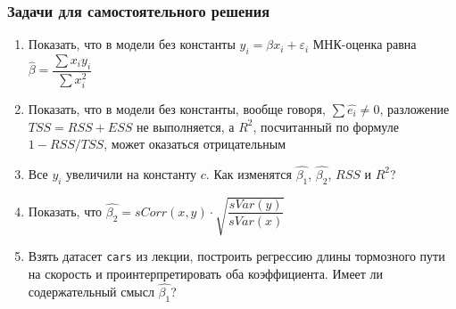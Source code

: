 \documentclass[12pt,a4paper]{article}
\numberwithin{equation}{section}
\theoremstyle{plain}
\theoremstyle{definition}
\theoremstyle{remark}
\begin{document}
\subsubsection{Задачи для самостоятельного решения}

\begin{enumerate}
    \item Показать, что в модели без константы $y_i = \beta x_i + \varepsilon_i$ МНК-оценка равна $\hat{\beta} = \dfrac{\sum x_i y_i}{\sum x_i^2}$
    \item Показать, что в модели без константы, вообще говоря, $\sum \hat{e_i} \neq 0$, разложение $TSS = RSS + ESS$ не выполняется, а $R^2$, посчитанный по формуле $1 - RSS / TSS$, может оказаться отрицательным
    \item Все $y_i$ увеличили на константу $c$. Как изменятся $\hat{\beta_1}$, $\hat{\beta_2}$, $RSS$ и $R^2$?
    \item Показать, что $\hat{\beta_2} = sCorr(x, y) \cdot \sqrt{\dfrac{sVar(y)}{sVar(x)}}$
    \item Взять датасет \texttt{cars} из лекции, построить регрессию длины тормозного пути на скорость и проинтерпретировать оба коэффициента. Имеет ли содержательный смысл $\hat{\beta_1}$?
\end{enumerate}
\end{document}
